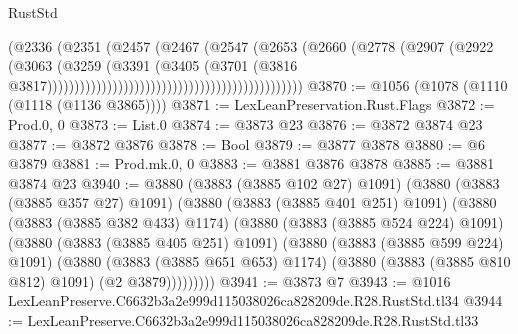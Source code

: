 \begin{lexlean}{RustStd}
\begin{coremodule}
                                                                  (@2336
                                                                    (@2351
                                                                      (@2457
                                                                        (@2467
                                                                          (@2547
                                                                            (@2653
                                                                              (@2660
                                                                                (@2778
                                                                                  (@2907
                                                                                    (@2922
                                                                                      (@3063
                                                                                        (@3259
                                                                                          (@3391
                                                                                            (@3405
                                                                                              (@3701
                                                                                                (@3816
                                                                                                  @3817)))))))))))))))))))))))))))))))))))))))))))))))
@3870 := @1056 (@1078 (@1110 (@1118 (@1136 @3865))))
@3871 := LexLeanPreservation.Rust.Flags
@3872 := Prod.{0, 0}
@3873 := List.{0}
@3874 := @3873 @23
@3876 := @3872 @3874 @23
@3877 := @3872 @3876
@3878 := Bool
@3879 := @3877 @3878
@3880 := @6 @3879
@3881 := Prod.mk.{0, 0}
@3883 := @3881 @3876 @3878
@3885 := @3881 @3874 @23
@3940 := @3880
    (@3883 (@3885 @102 @27) @1091)
    (@3880
      (@3883 (@3885 @357 @27) @1091)
      (@3880
        (@3883 (@3885 @401 @251) @1091)
        (@3880
          (@3883 (@3885 @382 @433) @1174)
          (@3880
            (@3883 (@3885 @524 @224) @1091)
            (@3880
              (@3883 (@3885 @405 @251) @1091)
              (@3880
                (@3883 (@3885 @599 @224) @1091)
                (@3880
                  (@3883 (@3885 @651 @653) @1174)
                  (@3880 (@3883 (@3885 @810 @812) @1091) (@2 @3879)))))))))
@3941 := @3873 @7
@3943 := @1016 LexLeanPreserve.C6632b3a2e999d115038026ca828209de.R28.RustStd.tl34
@3944 := LexLeanPreserve.C6632b3a2e999d115038026ca828209de.R28.RustStd.tl33

\end{coremodule}
\end{lexlean}
